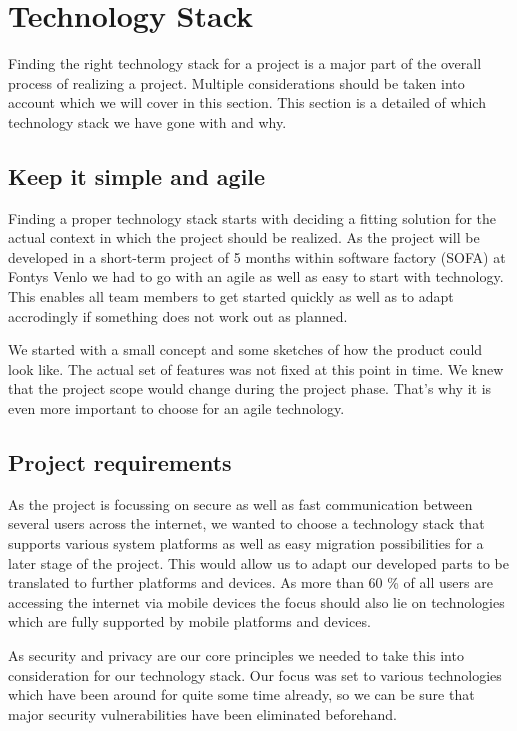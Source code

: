 \chapter{Technology Stack}
Finding the right technology stack for a project is a major part of the overall process of realizing a project. Multiple
considerations should be taken into account which we will cover in this section. This section is a detailed of which
technology stack we have gone with and why.

\section{Keep it simple and agile}


Finding a proper technology stack starts with deciding a fitting solution for the actual context in which the project
should be realized. As the project will be developed in a short-term project of 5 months within software factory (SOFA)
at Fontys Venlo we had to go with an agile as well as easy to start with technology. This enables all team members to
get started quickly as well as to adapt accrodingly if something does not work out as planned.

We started with a small concept and some sketches of how the product could look like. The actual set of features was not
fixed at this point in time. We knew that the project scope would change during the project phase. That’s why it is even
more important to choose for an agile technology.

\section{Project requirements}

As the project is focussing on secure as well as fast communication between several users across the internet, we wanted
to choose a technology stack that supports various system platforms as well as easy migration possibilities for a later
stage of the project. This would allow us to adapt our developed parts to be translated to further platforms and
devices. As more than 60 \% of all users are accessing the internet via mobile devices the focus should also lie on
technologies which are fully supported by mobile platforms and devices.

As security and privacy are our core principles we needed to take this into consideration for our technology stack.
Our focus was set to various technologies which have been around for quite some time already, so we can be sure that
major security vulnerabilities have been eliminated beforehand.

